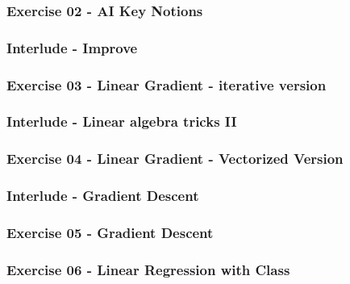 \documentclass[]{article}
\begin{document}
\hypertarget{exercise-02---ai-key-notions}{%
\subsubsection{Exercise 02 - AI Key
Notions}\label{exercise-02---ai-key-notions}}

\hypertarget{interlude---improve}{%
\subsubsection{Interlude - Improve}\label{interlude---improve}}

\hypertarget{exercise-03---linear-gradient---iterative-version}{%
\subsubsection{Exercise 03 - Linear Gradient - iterative
version}\label{exercise-03---linear-gradient---iterative-version}}

\hypertarget{interlude---linear-algebra-tricks-ii}{%
\subsubsection{Interlude - Linear algebra tricks
II}\label{interlude---linear-algebra-tricks-ii}}

\hypertarget{exercise-04---linear-gradient---vectorized-version}{%
\subsubsection{Exercise 04 - Linear Gradient - Vectorized
Version}\label{exercise-04---linear-gradient---vectorized-version}}

\hypertarget{interlude---gradient-descent}{%
\subsubsection{Interlude - Gradient
Descent}\label{interlude---gradient-descent}}

\hypertarget{exercise-05---gradient-descent}{%
\subsubsection{Exercise 05 - Gradient
Descent}\label{exercise-05---gradient-descent}}

\hypertarget{exercise-06---linear-regression-with-class}{%
\subsubsection{Exercise 06 - Linear Regression with
Class}\label{exercise-06---linear-regression-with-class}}
\end{document}

